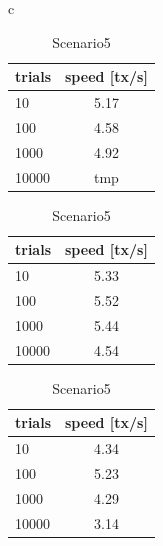 \documentclass[a4paper, oneside]{discothesis}
\begin{document}
\begin{table}[t]
    \begin{center}
        \begin{tabular}{c}

            \begin{minipage}{0.33\hsize}
                \begin{center}
                    \caption{Scenario3}
                    \begin{tabular}{|l|c|} \hline
                        trials & speed [tx/s]\\ \hline \hline
                        10 & 5.17 \\
                        100 & 4.58 \\
                        1000 & 4.92 \\
                        10000 & tmp \\ \hline
                    \end{tabular}
                \end{center}
            \end{minipage}

            \begin{minipage}{0.33\hsize}
                \begin{center}
                    \caption{Scenario4}
                    \begin{tabular}{|l|c|} \hline
                        trials & speed [tx/s]\\ \hline \hline
                        10 & 5.33 \\
                        100 & 5.52 \\
                        1000 & 5.44 \\
                        10000 & 4.54 \\ \hline
                    \end{tabular}
                \end{center}
            \end{minipage}

            \begin{minipage}{0.33\hsize}
                \begin{center}
                    \caption{Scenario5}
                    \begin{tabular}{|l|c|} \hline
                        trials & speed [tx/s]\\ \hline \hline
                        10 & 4.34 \\
                        100 & 5.23 \\
                        1000 & 4.29 \\
                        10000 & 3.14 \\ \hline
                    \end{tabular}
                \end{center}
            \end{minipage}

        \end{tabular}
    \end{center}
\end{table}
\end{document}
